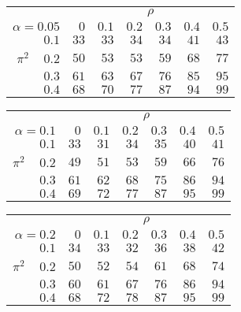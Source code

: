\begin{tabular}{r|rrrrrr}
\hline\hline
 &\multicolumn{6}{c}{$\rho$} \\ 
 $\alpha = 0.05$ & $0$ & $0.1$ & $0.2$ & $0.3$ & $0.4$ & $0.5$ \\ 
 \hline$0.1$ & $33$ & $33$ & $34$ & $34$ & $41$ & $43$\\ 
$\pi^2\;\;\;$ $0.2$ & $50$ & $53$ & $53$ & $59$ & $68$ & $77$\\ 
$0.3$ & $61$ & $63$ & $67$ & $76$ & $85$ & $95$\\ 
$0.4$ & $68$ & $70$ & $77$ & $87$ & $94$ & $99$\\ 
 \hline 
 \end{tabular}
 
 \vspace{2em} 
 
\begin{tabular}{r|rrrrrr}
\hline\hline
 &\multicolumn{6}{c}{$\rho$} \\ 
 $\alpha = 0.1$ & $0$ & $0.1$ & $0.2$ & $0.3$ & $0.4$ & $0.5$ \\ 
 \hline$0.1$ & $33$ & $31$ & $34$ & $35$ & $40$ & $41$\\ 
$\pi^2\;\;\;$ $0.2$ & $49$ & $51$ & $53$ & $59$ & $66$ & $76$\\ 
$0.3$ & $61$ & $62$ & $68$ & $75$ & $86$ & $94$\\ 
$0.4$ & $69$ & $72$ & $77$ & $87$ & $95$ & $99$\\ 
 \hline 
 \end{tabular}
 
 \vspace{2em} 
 
\begin{tabular}{r|rrrrrr}
\hline\hline
 &\multicolumn{6}{c}{$\rho$} \\ 
 $\alpha = 0.2$ & $0$ & $0.1$ & $0.2$ & $0.3$ & $0.4$ & $0.5$ \\ 
 \hline$0.1$ & $34$ & $33$ & $32$ & $36$ & $38$ & $42$\\ 
$\pi^2\;\;\;$ $0.2$ & $50$ & $52$ & $54$ & $61$ & $68$ & $74$\\ 
$0.3$ & $60$ & $61$ & $67$ & $76$ & $86$ & $94$\\ 
$0.4$ & $68$ & $72$ & $78$ & $87$ & $95$ & $99$\\ 
 \hline 
 \end{tabular}